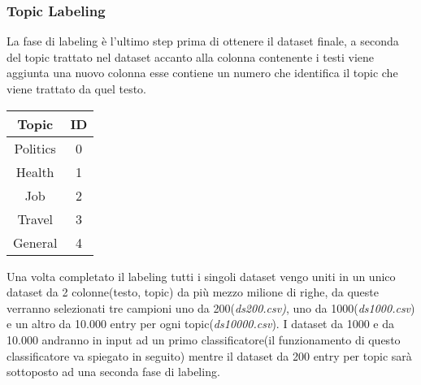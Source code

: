 \subsubsection{Topic Labeling}
\label{sssec:topiclabeling}
La fase di labeling è l'ultimo step prima di ottenere il dataset finale, a seconda del topic trattato nel dataset  accanto alla colonna contenente i testi viene aggiunta una nuovo colonna esse contiene un numero che identifica il topic che viene trattato da quel testo.
\FloatBarrier
\begin{table}[h]
\centering
\begin{tabular}{|c|c|}
\hline
\textbf{Topic} & \textbf{ID} \\ \hline
Politics & 0 \\ \hline
Health & 1 \\ \hline
Job & 2 \\ \hline
Travel & 3 \\ \hline
General & 4 \\ \hline
\end{tabular}
\end{table}
Una volta completato il labeling tutti i singoli dataset vengo uniti in un unico dataset da 2 colonne(testo, topic) da più mezzo milione di righe, da queste verranno selezionati tre campioni uno da 200(\textit{ds200.csv)}, uno da 1000(\textit{ds1000.csv}) e un altro da 10.000 entry per ogni topic(\textit{ds10000.csv}).\newline
I dataset da 1000 e da 10.000 andranno in input ad un primo classificatore(il funzionamento di questo classificatore va spiegato in seguito) mentre il dataset da 200 entry per topic sarà sottoposto ad una seconda fase di labeling.


